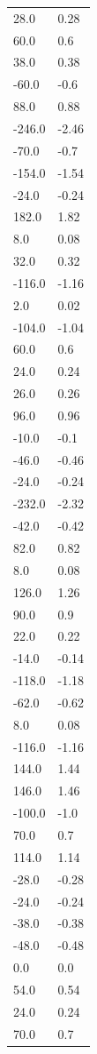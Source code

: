 \begin{longtable}{ll}
28.0 & 0.28 \\
60.0 & 0.6 \\
38.0 & 0.38 \\
-60.0 & -0.6 \\
88.0 & 0.88 \\
-246.0 & -2.46 \\
-70.0 & -0.7 \\
-154.0 & -1.54 \\
-24.0 & -0.24 \\
182.0 & 1.82 \\
8.0 & 0.08 \\
32.0 & 0.32 \\
-116.0 & -1.16 \\
2.0 & 0.02 \\
-104.0 & -1.04 \\
60.0 & 0.6 \\
24.0 & 0.24 \\
26.0 & 0.26 \\
96.0 & 0.96 \\
-10.0 & -0.1 \\
-46.0 & -0.46 \\
-24.0 & -0.24 \\
-232.0 & -2.32 \\
-42.0 & -0.42 \\
82.0 & 0.82 \\
8.0 & 0.08 \\
126.0 & 1.26 \\
90.0 & 0.9 \\
22.0 & 0.22 \\
-14.0 & -0.14 \\
-118.0 & -1.18 \\
-62.0 & -0.62 \\
8.0 & 0.08 \\
-116.0 & -1.16 \\
144.0 & 1.44 \\
146.0 & 1.46 \\
-100.0 & -1.0 \\
70.0 & 0.7 \\
114.0 & 1.14 \\
-28.0 & -0.28 \\
-24.0 & -0.24 \\
-38.0 & -0.38 \\
-48.0 & -0.48 \\
0.0 & 0.0 \\
54.0 & 0.54 \\
24.0 & 0.24 \\
70.0 & 0.7 \\

\end{longtable}
